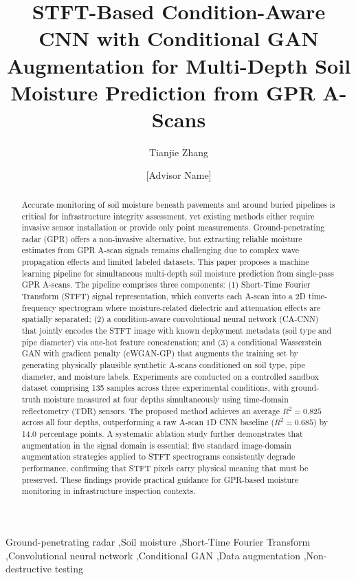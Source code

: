 \documentclass[review]{elsarticle}
\begin{document}
\begin{frontmatter}

\title{STFT-Based Condition-Aware CNN with Conditional GAN Augmentation for Multi-Depth Soil Moisture Prediction from GPR A-Scans}

\author[rut]{Tianjie Zhang}
\author[rut]{[Advisor Name]}

\address[rut]{Department of Civil and Environmental Engineering, Rutgers, The State University of New Jersey, Piscataway, NJ 08854, USA}

\begin{abstract}
Accurate monitoring of soil moisture beneath pavements and around buried pipelines is critical for infrastructure integrity assessment, yet existing methods either require invasive sensor installation or provide only point measurements. Ground-penetrating radar (GPR) offers a non-invasive alternative, but extracting reliable moisture estimates from GPR A-scan signals remains challenging due to complex wave propagation effects and limited labeled datasets. This paper proposes a machine learning pipeline for simultaneous multi-depth soil moisture prediction from single-pass GPR A-scans. The pipeline comprises three components: (1) Short-Time Fourier Transform (STFT) signal representation, which converts each A-scan into a 2D time-frequency spectrogram where moisture-related dielectric and attenuation effects are spatially separated; (2) a condition-aware convolutional neural network (CA-CNN) that jointly encodes the STFT image with known deployment metadata (soil type and pipe diameter) via one-hot feature concatenation; and (3) a conditional Wasserstein GAN with gradient penalty (cWGAN-GP) that augments the training set by generating physically plausible synthetic A-scans conditioned on soil type, pipe diameter, and moisture labels. Experiments are conducted on a controlled sandbox dataset comprising 135 samples across three experimental conditions, with ground-truth moisture measured at four depths simultaneously using time-domain reflectometry (TDR) sensors. The proposed method achieves an average $R^2 = 0.825$ across all four depths, outperforming a raw A-scan 1D CNN baseline ($R^2 = 0.685$) by 14.0 percentage points. A systematic ablation study further demonstrates that augmentation in the signal domain is essential: five standard image-domain augmentation strategies applied to STFT spectrograms consistently degrade performance, confirming that STFT pixels carry physical meaning that must be preserved. These findings provide practical guidance for GPR-based moisture monitoring in infrastructure inspection contexts.
\end{abstract}

\begin{keyword}
Ground-penetrating radar \sep Soil moisture \sep Short-Time Fourier Transform \sep Convolutional neural network \sep Conditional GAN \sep Data augmentation \sep Non-destructive testing
\end{keyword}

\end{frontmatter}
\end{document}

